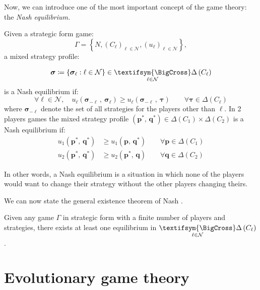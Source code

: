 Now, we can introduce one of the most important concept of the game
theory: the \textit{Nash equilibrium. }
\begin{defn}
Given a strategic form game:
\[
\Gamma=\left\{ N,\left(C_{\ell}\right)_{\ell\in\mathcal{N}},\left(u_{\ell}\right)_{\ell\in\mathcal{N}}\right\} ,
\]
 a mixed strategy profile:

\[\bm{\sigma}\coloneqq\left\{\bm{\sigma}_{\ell}:\ell\in\mathcal{N}\right\} \in \underset{\ell\in\mathcal{N}}{\textifsym{\BigCross}}\Delta\left(C_{\ell}\right)\]is
a Nash equilibrium if:
\[
\forall\ell\in\mathcal{N},\quad u_{\ell}\left(\bm{\sigma}_{-\ell}\,,\ \bm{\sigma}_{\ell}\right)\geq u_{\ell}\left(\bm{\sigma}_{-\ell}\,,\ \bm{\tau}\right)\qquad\forall\bm{\tau}\in\Delta\left(C_{\ell}\right)
\]
 where $\bm{\sigma}_{-\ell}$ denote the set of all strategies for
the players other than $\ell$. In 2 players games the mixed strategy
profile $\left(\mathbf{p}^{*},\,\mathbf{q}^{*}\right)\in\Delta\left(C_{1}\right)\times\Delta\left(C_{2}\right)$
is a Nash equilibrium if:
\begin{align*}
u_{1}\left(\mathbf{p}^{*},\,\mathbf{q}^{*}\right) & \geq u_{1}\left(\mathbf{p},\,\mathbf{q}^{*}\right)\qquad\forall\mathbf{p}\in\Delta\left(C_{1}\right)\\
u_{2}\left(\mathbf{p}^{*},\,\mathbf{q}^{*}\right) & \geq u_{2}\left(\mathbf{p}^{*},\,\mathbf{q}\right)\qquad\forall\mathbf{q}\in\Delta\left(C_{2}\right)
\end{align*}
\end{defn}

In other words, a Nash equilibrium is a situation in which none of
the players would want to change their strategy without the other
players changing theirs. 

We can now state the general existence theorem of Nash \cite{Nash1951}.
\begin{thm}
Given any game $\Gamma$ in strategic form with a finite number of
players and strategies, there exists at least one equilibrium in $\underset{\ell\in\mathcal{N}}{\textifsym{\BigCross}}\Delta\left(C_{\ell}\right)$.
\end{thm}


\section{Evolutionary game theory}

